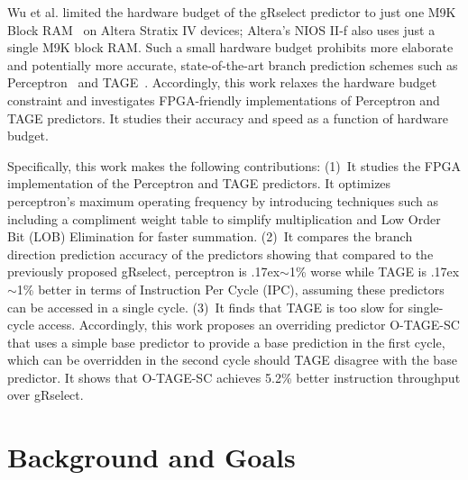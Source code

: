 \documentclass[conference]{IEEEtran}
\newcommand{\mytilde}{{\raise.17ex\hbox{$\scriptstyle\sim$}}}
\begin{document}
Wu et al. limited the hardware budget of the gRselect predictor to just one M9K Block RAM~\cite{StratixIVM9K} on Altera Stratix IV devices; Altera's NIOS II-f also uses just a single M9K block RAM. Such a small hardware budget prohibits more elaborate and potentially more accurate, state-of-the-art branch prediction schemes such as Perceptron~\cite{perceptron} and TAGE~\cite{tage}. Accordingly, this work relaxes the hardware budget constraint and investigates FPGA-friendly implementations of Perceptron and TAGE predictors. It studies their accuracy and speed as a function of hardware budget.  

Specifically, this work makes the following contributions: (1)~It studies the FPGA implementation of the Perceptron and TAGE predictors. It optimizes perceptron's maximum operating frequency by introducing techniques such as including a compliment weight table to simplify multiplication and Low Order Bit (LOB) Elimination for faster summation. (2)~It compares the branch direction prediction accuracy of the predictors showing that compared to the previously proposed gRselect, perceptron is \mytilde 1\% worse while TAGE is \mytilde 1\% better in terms of Instruction Per Cycle (IPC), assuming these predictors can be accessed in a single cycle. (3)~It finds that TAGE is too slow for single-cycle access. Accordingly, this work proposes an overriding predictor \mbox{O-TAGE-SC} that uses a simple base predictor to provide a base prediction in the first cycle, which can be overridden in the second cycle should TAGE disagree with the base predictor. It shows that \mbox{O-TAGE-SC} achieves 5.2\% better instruction throughput over gRselect.

\section{Background and Goals}
\label{sec:background}

\end{document}
